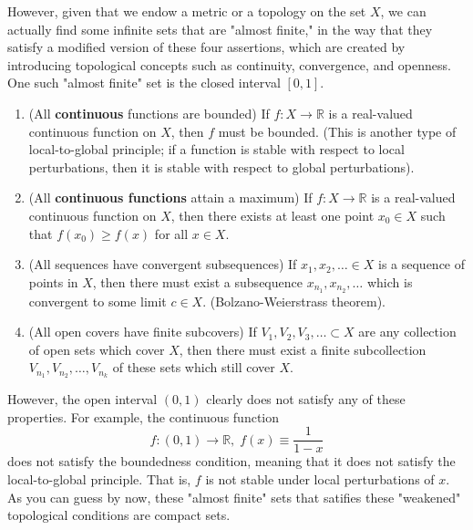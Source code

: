   However, given that we endow a metric or a topology on the set $X$, we can actually find some infinite sets that are "almost finite," in the way that they satisfy a modified version of these four assertions, which are created by introducing topological concepts such as continuity, convergence, and openness. One such "almost finite" set is the closed interval $[0,1]$. 
  \begin{enumerate}
    \item (All \textbf{continuous} functions are bounded) If $f: X \rightarrow \mathbb{R}$ is a real-valued continuous function on $X$, then $f$ must be bounded. (This is another type of local-to-global principle; if a function is stable with respect to local perturbations, then it is stable with respect to global perturbations).

    \item (All \textbf{continuous functions} attain a maximum) If $f: X \rightarrow \mathbb{R}$ is a real-valued continuous function on $X$, then there exists at least one point $x_0 \in X$ such that $f(x_0) \geq f(x)$ for all $x \in X$. 

    \item (All sequences have convergent subsequences) If $x_1, x_2, \ldots  \in X$ is a sequence of points in $X$, then there must exist a subsequence $x_{n_1}, x_{n_2}, \ldots $ which is convergent to some limit $c \in X$. (Bolzano-Weierstrass theorem).

    \item (All open covers have finite subcovers) If $V_1, V_2, V_3, \ldots  \subset X$ are any collection of open sets which cover $X$, then there must exist a finite subcollection $V_{n_1}, V_{n_2}, \ldots , V_{n_k}$ of these sets which still cover $X$. 
  \end{enumerate}
  
  However, the open interval $(0,1)$ clearly does not satisfy any of these properties. For example, the continuous function 
  \begin{equation}
    f: (0,1) \rightarrow \mathbb{R}, \; f(x) \equiv \frac{1}{1-x}
  \end{equation}
  does not satisfy the boundedness condition, meaning that it does not satisfy the local-to-global principle. That is, $f$ is not stable under local perturbations of $x$. As you can guess by now, these "almost finite" sets that satifies these "weakened" topological conditions are compact sets. 
  
  \begin{figure}[H]
    \centering 
    \caption{} 
    \label{fig:compact}
  \end{figure}
  

